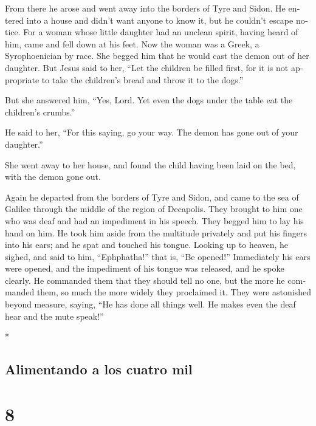 \begin{paracol}{2}
\begin{otherlanguage}{english}
 From there he arose and went away into the borders of
Tyre and Sidon. He entered into a house and didn't want anyone to know
it, but he couldn't escape notice.  For a woman whose
little daughter had an unclean spirit, having heard of him, came and
fell down at his feet.  Now the woman was a Greek, a
Syrophoenician by race. She begged him that he would cast the demon out
of her daughter.  But Jesus said to her, ``Let the
children be filled first, for it is not appropriate to take the
children's bread and throw it to the dogs.''

 But she answered him, ``Yes, Lord. Yet even the dogs
under the table eat the children's crumbs.''

 He said to her, ``For this saying, go your way. The
demon has gone out of your daughter.''

 She went away to her house, and found the child having
been laid on the bed, with the demon gone out.

 Again he departed from the borders of Tyre and Sidon,
and came to the sea of Galilee through the middle of the region of
Decapolis.  They brought to him one who was deaf and had
an impediment in his speech. They begged him to lay his hand on him.
 He took him aside from the multitude privately and put
his fingers into his ears; and he spat and touched his tongue.
 Looking up to heaven, he sighed, and said to him,
``Ephphatha!'' that is, ``Be opened!''  Immediately his
ears were opened, and the impediment of his tongue was released, and he
spoke clearly.  He commanded them that they should tell
no one, but the more he commanded them, so much the more widely they
proclaimed it.  They were astonished beyond measure,
saying, ``He has done all things well. He makes even the deaf hear and
the mute speak!''

\end{otherlanguage}

\switchcolumn[0]*

\hypertarget{alimentando-a-los-cuatro-mil}{%
\subsection{Alimentando a los cuatro
mil}\label{alimentando-a-los-cuatro-mil}}

\hypertarget{section-14}{%
\section{8}\label{section-14}}


\end{paracol}
